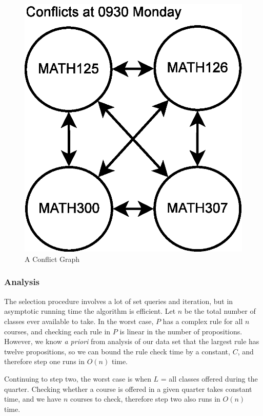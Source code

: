 \documentclass[11pt]{article} %
\begin{document}
\begin{figure} [ht] 
    \begin{center}
        \includegraphics[scale=0.35]{conflict_graph_ex} 
    \end{center} 
    \caption{A Conflict Graph} 
    \label{conflictg} 
\end{figure}

\subsubsection{Analysis} The selection procedure involves a lot of set queries
and iteration, but in asymptotic running time the algorithm is efficient.
Let $n$ be the total number of classes ever available to take.
In the worst case, $P$ has a complex rule for all $n$
courses, and checking each rule in $P$ is linear in the number of propositions.
However, we know {\it a priori} from analysis of our data set that the largest
rule has twelve propositions, so we can bound the rule check time by a constant,
$C$, and therefore step one runs in $O(n)$ time.

Continuing to step two, the worst case is when $L$ = {all classes offered during
the quarter}.  Checking whether a course is offered in a given quarter takes
constant time, and we have $n$ courses to check, therefore step two also
runs in $O(n)$ time.
\end{document}
